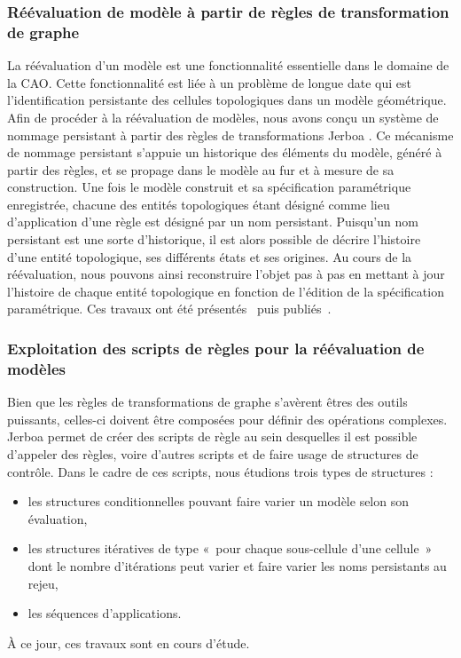 \documentclass[11pt,a4paper,oneside]{article}
\begin{document}
\subsubsection{Réévaluation de modèle à partir de règles de transformation de graphe}
La réévaluation d'un modèle est une fonctionnalité essentielle dans le domaine
de la CAO. %
Cette fonctionnalité est liée à un problème de longue date qui est
l'identification persistante des cellules topologiques dans un modèle
géométrique. %
Afin de procéder à la réévaluation de modèles, nous avons conçu un système de
nommage persistant à partir des règles de transformations Jerboa
\cite{belhaouari2014jerboa}. %
Ce mécanisme de nommage persistant s'appuie un historique des éléments du
modèle, généré à partir des règles, et se propage dans le modèle au fur et à
mesure de sa construction. %
Une fois le modèle construit et sa spécification paramétrique enregistrée,
chacune des entités topologiques étant désigné comme lieu d'application d'une
règle est désigné par un nom persistant. %
Puisqu'un nom persistant est une sorte d'historique, il est alors possible de
décrire l'histoire d'une entité topologique, ses différents états et ses
origines. %
Au cours de la réévaluation, nous pouvons ainsi reconstruire l'objet pas à pas
en mettant à jour l'histoire de chaque entité topologique en fonction de
l'édition de la spécification paramétrique. %
Ces travaux ont été présentés~\cite{gaide2023model, gaide2024reevaluationfr}
puis publiés~\cite{gaide2024reevaluation}. %

\subsubsection{Exploitation des scripts de règles pour la réévaluation de modèles}
Bien que les règles de transformations de graphe s'avèrent êtres des outils
puissants, celles-ci doivent être composées pour définir des opérations
complexes. %
Jerboa \cite{belhaouari2014jerboa} permet de créer des scripts de règle au sein
desquelles il est possible d'appeler des règles, voire d'autres scripts et de
faire usage de structures de contrôle. %
Dans le cadre de ces scripts, nous étudions trois types de structures :
\begin{itemize}
	\item les structures conditionnelles pouvant faire varier un modèle selon son
	      évaluation,
	\item les structures itératives de type «~pour chaque sous-cellule d'une
	      cellule~» dont le nombre d'itérations peut varier et faire varier les
	      noms persistants au rejeu,
	\item les séquences d'applications.
\end{itemize}
À ce jour, ces travaux sont en cours d'étude.
\end{document}
